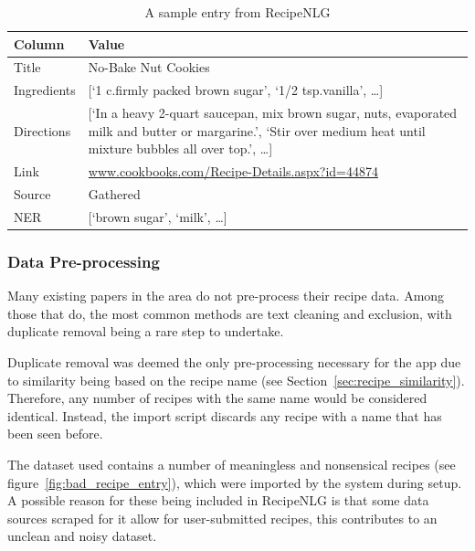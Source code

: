 \begin{table}[h]
    \caption{\label{tab:sample_entry}A sample entry from RecipeNLG}
    \begin{tabulary}{\textwidth}{lL}
        \toprule
        \textbf{Column}&\textbf{Value}\\\midrule
            Title & No-Bake Nut Cookies\\
            Ingredients & [\enquote*{1 c.\@ firmly packed brown sugar}, \enquote*{1/2 tsp.\@ vanilla}, \ldots]\\
            Directions & [\enquote*{In a heavy 2-quart saucepan, mix brown sugar, nuts, evaporated milk and butter or margarine.},
            \enquote*{Stir over medium heat until mixture bubbles all over top.}, \ldots]\\
            Link & \href{www.cookbooks.com/Recipe-Details.aspx?id=44874}{www.cookbooks.com/Recipe-Details.aspx?id=44874}\\
            Source & Gathered\\
            NER & [\enquote*{brown sugar}, \enquote*{milk}, \ldots]\\
        \bottomrule
    \end{tabulary}
\end{table}

\subsubsection{Data Pre-processing}
Many existing papers in the area do not pre-process their recipe data. Among those that do, the most
common methods are text cleaning and exclusion, with duplicate removal being a rare step to undertake.~\cite{bondevik_systematic_2024}

Duplicate removal was deemed the only pre-processing necessary for the \chef{} app due to similarity being
based on the recipe name (see Section~\ref{sec:recipe_similarity}). Therefore, any number of recipes with the same
name would be considered identical. Instead, the import script discards any recipe with a name that has been seen before.

The dataset used contains a number of meaningless and nonsensical recipes (see
figure~\ref{fig:bad_recipe_entry}), which were imported by the \chef{} system during setup.
A possible reason for these being included in RecipeNLG is that some
data sources scraped for it allow for user-submitted recipes, this contributes to
an unclean and noisy dataset.~\cite{kicherer_what_2018}

